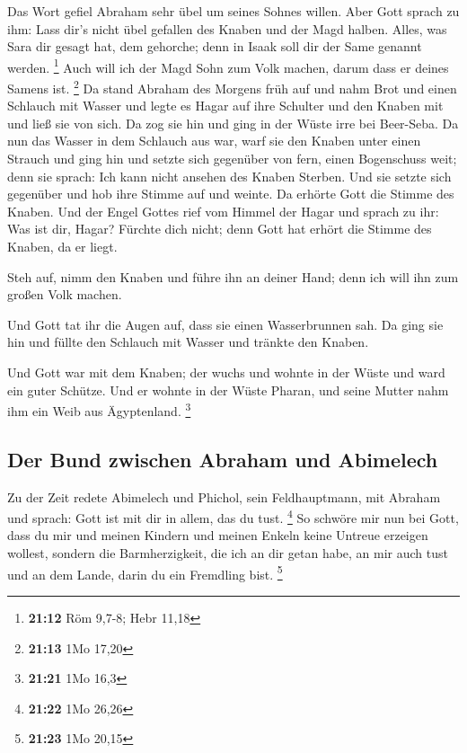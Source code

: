  Das Wort gefiel Abraham sehr übel um seines Sohnes
willen.  Aber Gott sprach zu ihm: Lass dir's nicht übel
gefallen des Knaben und der Magd halben. Alles, was Sara dir gesagt hat,
dem gehorche; denn in Isaak soll dir der Same genannt werden.
\footnote{\textbf{21:12} Röm 9,7-8; Hebr 11,18}  Auch
will ich der Magd Sohn zum Volk machen, darum dass er deines Samens ist.
\footnote{\textbf{21:13} 1Mo 17,20}  Da stand Abraham des
Morgens früh auf und nahm Brot und einen Schlauch mit Wasser und legte
es Hagar auf ihre Schulter und den Knaben mit und ließ sie von sich. Da
zog sie hin und ging in der Wüste irre bei Beer-Seba.  Da
nun das Wasser in dem Schlauch aus war, warf sie den Knaben unter einen
Strauch  und ging hin und setzte sich gegenüber von fern,
einen Bogenschuss weit; denn sie sprach: Ich kann nicht ansehen des
Knaben Sterben. Und sie setzte sich gegenüber und hob ihre Stimme auf
und weinte.  Da erhörte Gott die Stimme des Knaben. Und
der Engel Gottes rief vom Himmel der Hagar und sprach zu ihr: Was ist
dir, Hagar? Fürchte dich nicht; denn Gott hat erhört die Stimme des
Knaben, da er liegt.

 Steh auf, nimm den Knaben und führe ihn an deiner Hand;
denn ich will ihn zum großen Volk machen.

 Und Gott tat ihr die Augen auf, dass sie einen
Wasserbrunnen sah. Da ging sie hin und füllte den Schlauch mit Wasser
und tränkte den Knaben.

 Und Gott war mit dem Knaben; der wuchs und wohnte in der
Wüste und ward ein guter Schütze.  Und er wohnte in der
Wüste Pharan, und seine Mutter nahm ihm ein Weib aus Ägyptenland.
\footnote{\textbf{21:21} 1Mo 16,3}

\hypertarget{der-bund-zwischen-abraham-und-abimelech}{%
\subsection{Der Bund zwischen Abraham und
Abimelech}\label{der-bund-zwischen-abraham-und-abimelech}}

 Zu der Zeit redete Abimelech und Phichol, sein
Feldhauptmann, mit Abraham und sprach: Gott ist mit dir in allem, das du
tust. \footnote{\textbf{21:22} 1Mo 26,26}  So schwöre mir
nun bei Gott, dass du mir und meinen Kindern und meinen Enkeln keine
Untreue erzeigen wollest, sondern die Barmherzigkeit, die ich an dir
getan habe, an mir auch tust und an dem Lande, darin du ein Fremdling
bist. \footnote{\textbf{21:23} 1Mo 20,15}

